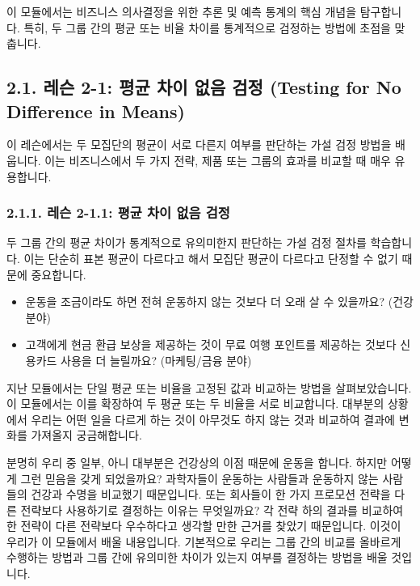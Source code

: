 \documentclass[11pt,a4paper]{book}
\theoremstyle{definition}
\begin{document}
이 모듈에서는 비즈니스 의사결정을 위한 추론 및 예측 통계의 핵심 개념을 탐구합니다. 특히, 두 그룹 간의 평균 또는 비율 차이를 통계적으로 검정하는 방법에 초점을 맞춥니다.

\subsection{2.1. 레슨 2-1: 평균 차이 없음 검정 (Testing for No Difference in Means)}

이 레슨에서는 두 모집단의 평균이 서로 다른지 여부를 판단하는 가설 검정 방법을 배웁니다. 이는 비즈니스에서 두 가지 전략, 제품 또는 그룹의 효과를 비교할 때 매우 유용합니다.

\subsubsection*{2.1.1. 레슨 2-1.1: 평균 차이 없음 검정}

\begin{summarybox}[title=핵심 요약: 두 평균의 차이 검정]
두 그룹 간의 평균 차이가 통계적으로 유의미한지 판단하는 가설 검정 절차를 학습합니다. 이는 단순히 표본 평균이 다르다고 해서 모집단 평균이 다르다고 단정할 수 없기 때문에 중요합니다.
\end{summarybox}

\begin{examplebox}[title=생각해 볼 질문: 실제 비즈니스에서의 차이]
\begin{itemize}
    \item 운동을 조금이라도 하면 전혀 운동하지 않는 것보다 더 오래 살 수 있을까요? (건강 분야)
    \item 고객에게 현금 환급 보상을 제공하는 것이 무료 여행 포인트를 제공하는 것보다 신용카드 사용을 더 늘릴까요? (마케팅/금융 분야)
\end{itemize}
\end{examplebox}

지난 모듈에서는 단일 평균 또는 비율을 고정된 값과 비교하는 방법을 살펴보았습니다. 이 모듈에서는 이를 확장하여 두 평균 또는 두 비율을 서로 비교합니다. 대부분의 상황에서 우리는 어떤 일을 다르게 하는 것이 아무것도 하지 않는 것과 비교하여 결과에 변화를 가져올지 궁금해합니다.

분명히 우리 중 일부, 아니 대부분은 건강상의 이점 때문에 운동을 합니다. 하지만 어떻게 그런 믿음을 갖게 되었을까요? 과학자들이 운동하는 사람들과 운동하지 않는 사람들의 건강과 수명을 비교했기 때문입니다. 또는 회사들이 한 가지 프로모션 전략을 다른 전략보다 사용하기로 결정하는 이유는 무엇일까요? 각 전략 하의 결과를 비교하여 한 전략이 다른 전략보다 우수하다고 생각할 만한 근거를 찾았기 때문입니다. 이것이 우리가 이 모듈에서 배울 내용입니다. 기본적으로 우리는 그룹 간의 비교를 올바르게 수행하는 방법과 그룹 간에 유의미한 차이가 있는지 여부를 결정하는 방법을 배울 것입니다.
\end{document}
